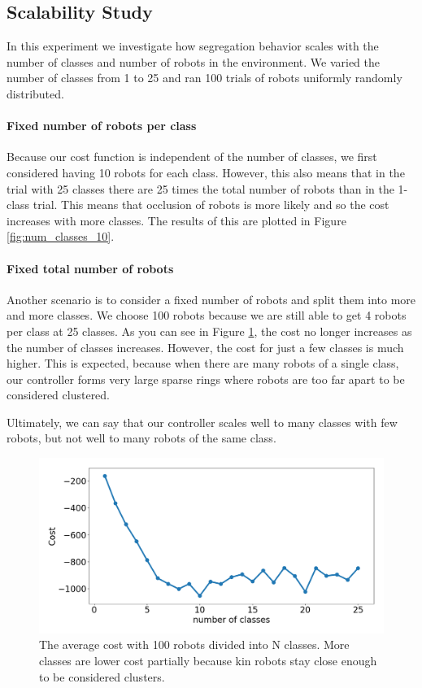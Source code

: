 \documentclass[conference]{IEEEtran}
\begin{document}
  \subsection{Scalability Study} \label{section:scalability}

    In this experiment we investigate how segregation behavior scales with the number of classes and number of robots in the environment. We varied the number of classes from 1 to 25 and ran 100 trials of robots uniformly randomly distributed.

    \paragraph{Fixed number of robots per class}

    Because our cost function is independent of the number of classes, we first considered having 10 robots for each class. However, this also means that in the trial with 25 classes there are 25 times the total number of robots than in the 1-class trial. This means that occlusion of robots is more likely and so the cost increases with more classes. The results of this are plotted in Figure  \ref{fig:num_classes_10}.

    \paragraph{Fixed total number of robots}

    Another scenario is to consider a fixed number of robots and split them into more and more classes. We choose 100 robots because we are still able to get 4 robots per class at 25 classes. As you can see in Figure \ref{fig:num_classes_100}, the cost no longer increases as the number of classes increases. However, the cost for just a few classes is much higher. This is expected, because when there are many robots of a single class, our controller forms very large sparse rings where robots are too far apart to be considered clustered.

    Ultimately, we can say that our controller scales well to many classes with few robots, but not well to many robots of the same class.

    \begin{figure}[H]
      \centering
      \includegraphics[width=1\linewidth]{./images/num_classes_vs_cost_100_robots.png}
      \caption{The average cost with 100 robots divided into N classes. More classes are lower cost partially because kin robots stay close enough to be considered clusters.}
      \label{fig:num_classes_100}
    \end{figure}
\end{document}
